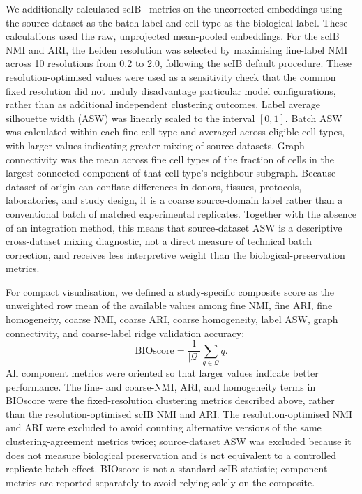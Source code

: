\documentclass[pdflatex,sn-nature]{sn-jnl}%
\theoremstyle{thmstyleone}%
\theoremstyle{thmstyletwo}%
\theoremstyle{thmstylethree}%
\begin{document}
We additionally calculated scIB~\cite{Luecken2021} metrics on the uncorrected embeddings using the source dataset as the batch label and cell type as the biological label.
These calculations used the raw, unprojected mean-pooled embeddings.
For the scIB NMI and ARI, the Leiden resolution was selected by maximising fine-label NMI across 10 resolutions from 0.2 to 2.0, following the scIB default procedure.
These resolution-optimised values were used as a sensitivity check that the common fixed resolution did not unduly disadvantage particular model configurations, rather than as additional independent clustering outcomes.
Label average silhouette width (ASW) was linearly scaled to the interval \([0,1]\).
Batch ASW was calculated within each fine cell type and averaged across eligible cell types, with larger values indicating greater mixing of source datasets.
Graph connectivity was the mean across fine cell types of the fraction of cells in the largest connected component of that cell type's neighbour subgraph.
Because dataset of origin can conflate differences in donors, tissues, protocols, laboratories, and study design, it is a coarse source-domain label rather than a conventional batch of matched experimental replicates.
Together with the absence of an integration method, this means that source-dataset ASW is a descriptive cross-dataset mixing diagnostic, not a direct measure of technical batch correction, and receives less interpretive weight than the biological-preservation metrics.

For compact visualisation, we defined a study-specific composite score as the unweighted row mean of the available values among fine NMI, fine ARI, fine homogeneity, coarse NMI, coarse ARI, coarse homogeneity, label ASW, graph connectivity, and coarse-label ridge validation accuracy:
\begin{equation}
    \mathrm{BIOscore}=\frac{1}{|\mathcal{Q}|}\sum_{q\in\mathcal{Q}}q.
\end{equation}
All component metrics were oriented so that larger values indicate better performance.
The fine- and coarse-NMI, ARI, and homogeneity terms in BIOscore were the fixed-resolution clustering metrics described above, rather than the resolution-optimised scIB NMI and ARI.
The resolution-optimised NMI and ARI were excluded to avoid counting alternative versions of the same clustering-agreement metrics twice; source-dataset ASW was excluded because it does not measure biological preservation and is not equivalent to a controlled replicate batch effect.
BIOscore is not a standard scIB statistic; component metrics are reported separately to avoid relying solely on the composite.
\end{document}
